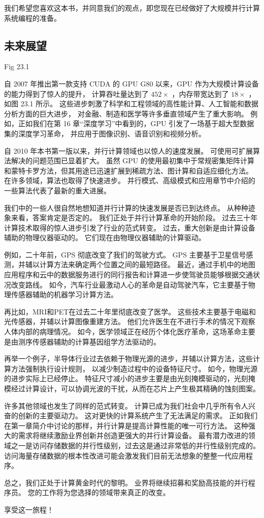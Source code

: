 我们希望您喜欢这本书，并同意我们的观点，即您现在已经做好了大规模并行计算系统编程的准备。

\subsection{未来展望}
{\color{red} Fig 23.1}

自 2007 年推出第一款支持 CUDA 的 GPU G80 以来，GPU 作为大规模计算设备的能力得到了惊人的提升，
计算吞吐量达到了 $452\times$ ，内存带宽达到了 $18\times$ ，如图 23.1 所示。 
这些进步刺激了科学和工程领域的高性能计算、人工智能和数据分析方面的巨大进步，
对金融、制造和医学等许多垂直领域产生了重大影响。 
例如，正如我们在第 16 章“深度学习”中看到的，GPU 引发了一场基于超大型数据集的深度学习革命，
并应用于图像识别、语音识别和视频分析。

自 2010 年本书第一版以来，并行计算领域也以惊人的速度发展。 可使用可扩展算法解决的问题范围已显着扩大。 
虽然 GPU 的使用最初集中于常规密集矩阵计算和蒙特卡罗方法，但其用途已迅速扩展到稀疏方法、图计算和自适应细化方法。 
在许多领域，算法也取得了快速进步。 并行模式、高级模式和应用章节中介绍的一些算法代表了最新的重大进展。

我们中的一些人很自然地想知道并行计算的快速发展是否已到达终点。 从种种迹象来看，答案肯定是否定的。 
我们正处于并行计算革命的开始阶段。 过去三十年计算技术取得的惊人进步引发了行业的范式转变。 
过去，重大创新是由计算设备辅助的物理仪器驱动的。 它们现在由物理仪器辅助的计算驱动。

例如，二十年前，GPS 彻底改变了我们的驾驶方式。 GPS 主要基于卫星信号感测，并辅以计算方法来确定两个位置之间的最短路径。 
最近，通过手机中的地图应用程序和云中的数据服务进行的同行报告和计算进一步使驾驶员能够根据交通状况改变路线。 
如今，汽车行业最激动人心的革命是自动驾驶汽车，它主要基于物理传感器辅助的机器学习计算方法。

再比如，MRI和PET在过去二十年里彻底改变了医学。 这些技术主要基于电磁和光传感器，并辅以计算图像重建方法。 
他们允许医生在不进行手术的情况下观察人体内部的病理情况。 
如今，医学领域正在经历个体化医疗革命，这场革命主要是由测序传感器辅助的计算基因组学方法驱动的。

再举一个例子，半导体行业过去依赖于物理光源的进步，并辅以计算方法，这些计算方法强制执行设计规则，
以减少制造过程中的设备特征尺寸。 如今，物理光源的进步实际上已经停止。 
特征尺寸减小的进步主要是由光刻掩模驱动的，光刻掩模经过计算设计，可以协调光波的干扰，从而在芯片上产生极其精确的蚀刻图案。

许多其他领域也发生了同样的范式转变。 计算已成为我们社会中几乎所有令人兴奋的创新的主要驱动力。 
这对更快的计算系统产生了无法满足的需求。 正如我们在第一章简介中讨论的那样，并行计算是提高计算性能的唯一可行方法。 
这种强大的需求将继续激励业界创新并创造更强大的并行计算设备。 
最有潜力改进的领域之一是访问存储数据的并行性级别，过去这是通过非常低的并行性级别完成的。 
访问海量存储数据的根本性改进可能会激发我们目前无法想象的整整一代应用程序。

总之，我们正处于计算黄金时代的黎明。 业界将继续招募和奖励高技能的并行程序员。 
您的工作将为您选择的领域带来真正的改变。

享受这一旅程！